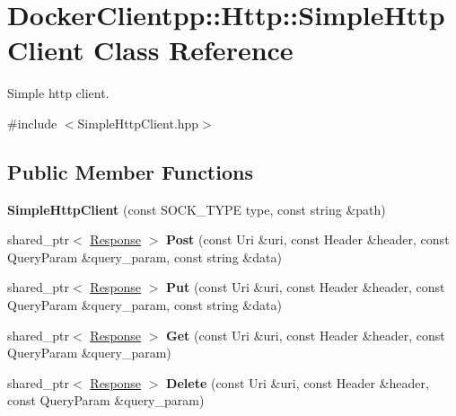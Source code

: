 \hypertarget{classDockerClientpp_1_1Http_1_1SimpleHttpClient}{}\section{Docker\+Clientpp\+::Http\+::Simple\+Http\+Client Class Reference}
\label{classDockerClientpp_1_1Http_1_1SimpleHttpClient}


Simple http client.  




{\ttfamily \#include $<$Simple\+Http\+Client.\+hpp$>$}

\subsection*{Public Member Functions}
\begin{DoxyCompactItemize}
\item 
\mbox{\label{classDockerClientpp_1_1Http_1_1SimpleHttpClient_aa34cb3560fdcf6f77d223ae4b5e88f9d}} 
{\bfseries Simple\+Http\+Client} (const S\+O\+C\+K\+\_\+\+T\+Y\+PE type, const string \&path)
\item 
\mbox{\label{classDockerClientpp_1_1Http_1_1SimpleHttpClient_aa0aa08c46d9eafcb6ca1ac1e262ca205}} 
shared\+\_\+ptr$<$ \mbox{\hyperlink{structDockerClientpp_1_1Http_1_1Response}{Response}} $>$ {\bfseries Post} (const Uri \&uri, const Header \&header, const Query\+Param \&query\+\_\+param, const string \&data)
\item 
\mbox{\label{classDockerClientpp_1_1Http_1_1SimpleHttpClient_a97f27933dc37b61b86f34f1b1273cb06}} 
shared\+\_\+ptr$<$ \mbox{\hyperlink{structDockerClientpp_1_1Http_1_1Response}{Response}} $>$ {\bfseries Put} (const Uri \&uri, const Header \&header, const Query\+Param \&query\+\_\+param, const string \&data)
\item 
\mbox{\label{classDockerClientpp_1_1Http_1_1SimpleHttpClient_a06e9fc45a945d3570917c7bf48485e6d}} 
shared\+\_\+ptr$<$ \mbox{\hyperlink{structDockerClientpp_1_1Http_1_1Response}{Response}} $>$ {\bfseries Get} (const Uri \&uri, const Header \&header, const Query\+Param \&query\+\_\+param)
\item 
\mbox{\label{classDockerClientpp_1_1Http_1_1SimpleHttpClient_a00f6bc99b658e3d5b7f9755403f8305c}} 
shared\+\_\+ptr$<$ \mbox{\hyperlink{structDockerClientpp_1_1Http_1_1Response}{Response}} $>$ {\bfseries Delete} (const Uri \&uri, const Header \&header, const Query\+Param \&query\+\_\+param)
\end{DoxyCompactItemize}


